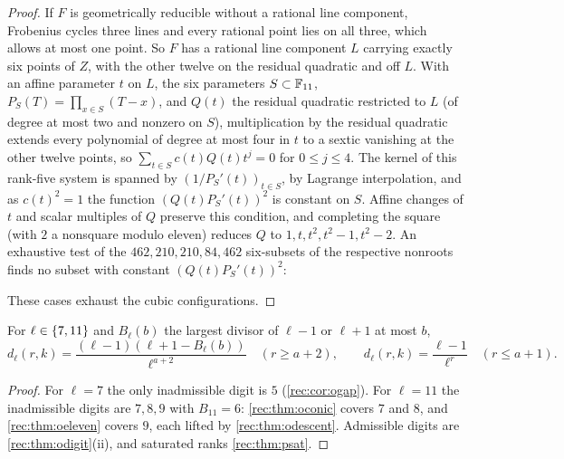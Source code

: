 \begin{proof}
If $F$ is geometrically reducible without a rational line component, Frobenius cycles three lines and every
rational point lies on all three, which allows at most one point. So $F$ has a rational line component $L$
carrying exactly six points of $Z$, with the other twelve on the residual quadratic and off $L$. With an affine
parameter $t$ on $L$, the six parameters $S\subset\mathbb{F}_{11}$, $P_S(T)=\prod_{x\in S}(T-x)$, and $Q(t)$ the residual quadratic restricted
to $L$ (of degree at most two and nonzero on $S$), multiplication by the residual quadratic extends every
polynomial of degree at most four in $t$ to a sextic vanishing at the other twelve points, so
$\sum_{t\in S}c(t)Q(t)t^j=0$ for $0\le j\le4$. The kernel of this rank-five system is spanned by $(1/P_S'(t))_{t\in S}$, by Lagrange
interpolation, and as $c(t)^2=1$ the function $(Q(t)P_S'(t))^2$ is constant on $S$. Affine changes of $t$ and scalar
multiples of $Q$ preserve this condition, and completing the square (with $2$ a nonsquare modulo eleven) reduces
$Q$ to $1,t,t^2,t^2-1,t^2-2$. An exhaustive test of the $462,210,210,84,462$ six-subsets of the respective nonroots finds no
subset with constant $(Q(t)P_S'(t))^2$:
\begin{center}
\end{center}
These cases exhaust the cubic configurations.
\end{proof}

\begin{corollary}\label{rec:cor:oseveneleven}
For $\ell\in\{7,11\}$ and $B_\ell(b)$ the largest divisor of $\ell-1$ or $\ell+1$ at most $b$,
\[
 d_\ell(r,k)=\frac{(\ell-1)(\ell+1-B_\ell(b))}{\ell^{a+2}}\quad(r\ge a+2),\qquad d_\ell(r,k)=\frac{\ell-1}{\ell^r}\quad(r\le a+1).
\]
\end{corollary}

\begin{proof}
For $\ell=7$ the only inadmissible digit is $5$ (\cref{rec:cor:ogap}). For $\ell=11$ the inadmissible digits are $7,8,9$ with
$B_{11}=6$: \cref{rec:thm:oconic} covers $7$ and $8$, and \cref{rec:thm:oeleven} covers $9$, each lifted by \cref{rec:thm:odescent}.
Admissible digits are \cref{rec:thm:odigit}(ii), and saturated ranks \cref{rec:thm:psat}.
\end{proof}

